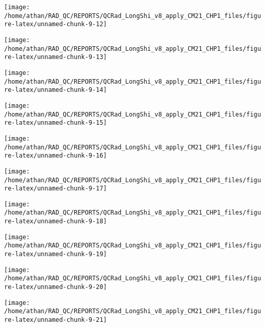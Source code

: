 \documentclass[
  10pt,
  a4paper,oneside]{article}
\begin{document}
\begin{center}\texttt{[image: /home/athan/RAD\_QC/REPORTS/QCRad\_LongShi\_v8\_apply\_CM21\_CHP1\_files/figure-latex/unnamed-chunk-9-12]} \end{center}

\begin{center}\texttt{[image: /home/athan/RAD\_QC/REPORTS/QCRad\_LongShi\_v8\_apply\_CM21\_CHP1\_files/figure-latex/unnamed-chunk-9-13]} \end{center}

\begin{center}\texttt{[image: /home/athan/RAD\_QC/REPORTS/QCRad\_LongShi\_v8\_apply\_CM21\_CHP1\_files/figure-latex/unnamed-chunk-9-14]} \end{center}

\begin{center}\texttt{[image: /home/athan/RAD\_QC/REPORTS/QCRad\_LongShi\_v8\_apply\_CM21\_CHP1\_files/figure-latex/unnamed-chunk-9-15]} \end{center}

\begin{center}\texttt{[image: /home/athan/RAD\_QC/REPORTS/QCRad\_LongShi\_v8\_apply\_CM21\_CHP1\_files/figure-latex/unnamed-chunk-9-16]} \end{center}

\begin{center}\texttt{[image: /home/athan/RAD\_QC/REPORTS/QCRad\_LongShi\_v8\_apply\_CM21\_CHP1\_files/figure-latex/unnamed-chunk-9-17]} \end{center}

\begin{center}\texttt{[image: /home/athan/RAD\_QC/REPORTS/QCRad\_LongShi\_v8\_apply\_CM21\_CHP1\_files/figure-latex/unnamed-chunk-9-18]} \end{center}

\begin{center}\texttt{[image: /home/athan/RAD\_QC/REPORTS/QCRad\_LongShi\_v8\_apply\_CM21\_CHP1\_files/figure-latex/unnamed-chunk-9-19]} \end{center}

\begin{center}\texttt{[image: /home/athan/RAD\_QC/REPORTS/QCRad\_LongShi\_v8\_apply\_CM21\_CHP1\_files/figure-latex/unnamed-chunk-9-20]} \end{center}

\begin{center}\texttt{[image: /home/athan/RAD\_QC/REPORTS/QCRad\_LongShi\_v8\_apply\_CM21\_CHP1\_files/figure-latex/unnamed-chunk-9-21]} \end{center}
\end{document}
